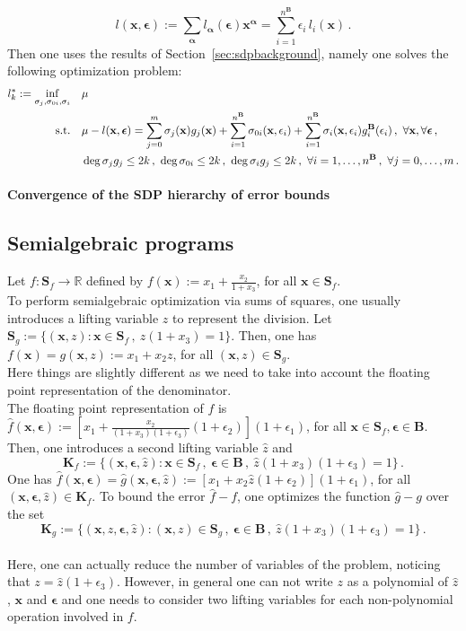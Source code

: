 \documentclass[a4paper,10pt]{article}
\newcommand{\R}{\mathbb{R}}
\newcommand{\x}{\mathbf{x}}
\newcommand{\alphab}{\boldsymbol{\alpha}}
\newcommand{\epsilonb}{\boldsymbol{\epsilon}}
\def\S{\mathbf{S}}
\def\B{\mathbf{B}}
\def\K{\mathbf{K}}
\theoremstyle{plain}
\theoremstyle{definition}
\theoremstyle{remark}
\begin{document}
\[ 
l(\x,\epsilonb):= \sum_{\alphab} l_{\alphab}(\epsilonb) \x^{\alphab} = \sum_{i=1}^{n^\B} \epsilon_i \, l_i(\x) \,.
\]
Then one uses the results of Section~\ref{sec:sdpbackground}, namely one solves the following optimization problem:
%
\begin{align}
\label{eq:primalexists}
l^*_k := \inf\limits_{\sigma_j, \sigma_{0 i}, \sigma_{i}} \quad & \mu \\			
\text{s.t.} \quad & \mu - l(\x, \epsilonb) = 
\sum_{j=0}^m \sigma_j(\x) g_j(\x) + 
\sum_{i=1}^{n^{\B}}\sigma_{0 i}(\x,\epsilon_i) +  \sum_{i=1}^{n^{\B}}\sigma_i(\x,\epsilon_i) g_i^{\B}(\epsilon_i)  \,, \
\forall \x, \forall \epsilonb \,, \notag\\
\quad & 
\deg \sigma_j g_j \leq 2 k \,, \ 
\deg \sigma_{0 i} \leq 2 k \,, \ 
\deg \sigma_i g_j \leq 2 k \,, \ 
\forall i = 1,\dots,n^{\B} \,, \ 
\forall j = 0,\dots,m \,. \notag
\end{align}

\paragraph{Convergence of the SDP hierarchy of error bounds}

\subsection{Semialgebraic programs}

Let $f : \S_f \to \R$ defined by $f(\x) := x_1 + \frac{x_2}{1 + x_3}$, for all $\x \in \S_f$. \\
To perform semialgebraic optimization via sums of squares, one usually introduces a lifting variable  $z$ to represent the division. Let $\S_g := \{(\x,z) : \x \in \S_f\,, \ z (1 + x_3) = 1  \}$.
Then, one has $f(\x) = g(\x,z) := x_1 + x_2 z$, for all $(\x,z) \in \S_g$. \\
Here things are slightly different as we need to take into account the floating point representation of the denominator.\\
The floating point representation of $f$ is $\hat{f}(\x,\epsilonb) := [x_1 + \frac{x_2}{(1 + x_3)(1 + \epsilon_3)}(1 + \epsilon_2)](1 + \epsilon_1)$, for all $\x \in \S_f, \epsilonb \in \B$.
Then, one introduces a second lifting variable $\hat{z}$ and 
\[\K_f := \{(\x, \epsilonb, \hat{z}) : \x \in \S_f \,, \ \epsilonb \in \B \,, \ \hat{z} (1 + x_3) (1 + \epsilon_3) = 1  \} \,. \]
One has $\hat{f}(\x,\epsilonb) = \hat{g}(\x,\epsilonb,\hat{z}) := [x_1 + x_2 \hat{z}(1+\epsilon_2) ](1+\epsilon_1)$, for all $(\x, \epsilonb, \hat{z}) \in \K_f$. 
To bound the error $\hat{f} -f$, one optimizes the function $\hat{g} - g$ over the set 
\[\K_g := \{(\x, z, \epsilonb, \hat{z}) : (\x,z) \in \S_g \,, \ \epsilonb \in \B \,, \ \hat{z} (1 + x_3) (1 + \epsilon_3) = 1  \} \,. \]
\\
Here, one can actually reduce the number of variables of the problem, noticing that $z = \hat{z} (1 + \epsilon_3)$. However, in general one can not write $z$ as a polynomial of $\hat{z}$, $\x$ and $\epsilonb$ and one needs to consider two lifting variables for each non-polynomial operation involved in $f$.
%
\end{document}
